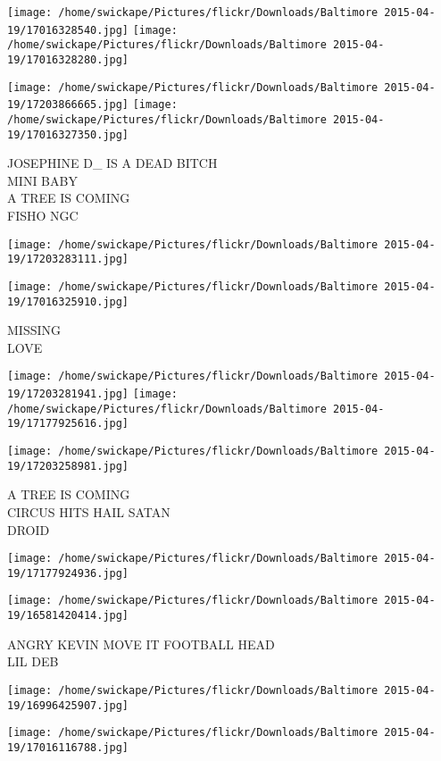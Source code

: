 \documentclass[10pt,letterpaper]{article}
\begin{document}
\texttt{[image: /home/swickape/Pictures/flickr/Downloads/Baltimore 2015-04-19/17016328540.jpg]}
\texttt{[image: /home/swickape/Pictures/flickr/Downloads/Baltimore 2015-04-19/17016328280.jpg]}

\texttt{[image: /home/swickape/Pictures/flickr/Downloads/Baltimore 2015-04-19/17203866665.jpg]}
\texttt{[image: /home/swickape/Pictures/flickr/Downloads/Baltimore 2015-04-19/17016327350.jpg]}

JOSEPHINE D\_ IS A DEAD BITCH\\
MINI BABY\\
A TREE IS COMING\\
FISHO NGC
\pagebreak

\texttt{[image: /home/swickape/Pictures/flickr/Downloads/Baltimore 2015-04-19/17203283111.jpg]}

\vspace{0.25in}
\texttt{[image: /home/swickape/Pictures/flickr/Downloads/Baltimore 2015-04-19/17016325910.jpg]}

MISSING\\
LOVE
\pagebreak

\texttt{[image: /home/swickape/Pictures/flickr/Downloads/Baltimore 2015-04-19/17203281941.jpg]}
\texttt{[image: /home/swickape/Pictures/flickr/Downloads/Baltimore 2015-04-19/17177925616.jpg]}

\texttt{[image: /home/swickape/Pictures/flickr/Downloads/Baltimore 2015-04-19/17203258981.jpg]}

A TREE IS COMING\\
CIRCUS HITS HAIL SATAN\\
DROID
\pagebreak

\texttt{[image: /home/swickape/Pictures/flickr/Downloads/Baltimore 2015-04-19/17177924936.jpg]}

\vspace{0.25in}
\texttt{[image: /home/swickape/Pictures/flickr/Downloads/Baltimore 2015-04-19/16581420414.jpg]}

ANGRY KEVIN MOVE IT FOOTBALL HEAD\\
LIL DEB
\pagebreak

\texttt{[image: /home/swickape/Pictures/flickr/Downloads/Baltimore 2015-04-19/16996425907.jpg]}

\vspace{0.25in}
\texttt{[image: /home/swickape/Pictures/flickr/Downloads/Baltimore 2015-04-19/17016116788.jpg]}
\end{document}
